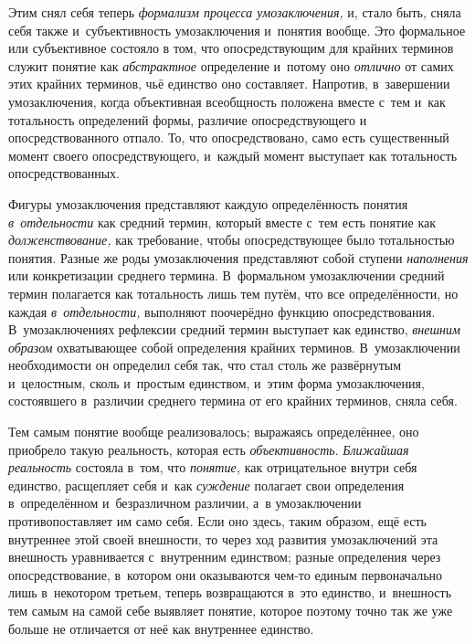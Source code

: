 Этим снял себя теперь {\em формализм процесса умозаключения,}
и, стало быть, сняла себя также и~субъективность
умозаключения и~понятия вообще. Это формальное или субъективное состояло в
том, что опосредствующим для крайних терминов служит понятие как
{\em абстрактное} определение и~потому оно {\em отлично} от самих
этих крайних терминов, чьё единство оно составляет. Напротив, в~завершении
умозаключения, когда объективная всеобщность положена вместе с~тем и~как
тотальность определений формы, различие опосредствующего и
опосредствованного отпало. То, что опосредствовано, само есть существенный
момент своего опосредствующего, и~каждый момент выступает как тотальность
опосредствованных.

Фигуры умозаключения представляют каждую определённость
понятия {\em в~отдельности}
как средний термин, который вместе с~тем есть понятие как
{\em долженствование,}
как требование, чтобы опосредствующее было тотальностью
понятия. Разные же роды умозаключения представляют собой ступени
{\em наполнения} или
конкретизации среднего термина. В~формальном умозаключении средний термин
полагается как тотальность лишь тем путём, что все определённости, но
каждая {\em в~отдельности,}
выполняют поочерёдно функцию опосредствования.
В~умозаключениях рефлексии средний термин выступает как единство,
{\em внешним образом} охватывающее собой определения крайних терминов.
В~умозаключении необходимости он определил себя так, что стал столь же
развёрнутым и~целостным, сколь и~простым единством, и~этим форма
умозаключения, состоявшего в~различии среднего термина от его крайних
терминов, сняла себя.

Тем самым понятие вообще реализовалось; выражаясь
определённее, оно приобрело такую реальность, которая есть
{\em объективность}. {\em Ближайшая реальность} состояла в~том, что
{\em понятие,} как отрицательное внутри себя единство, расщепляет себя и~как
{\em суждение} полагает
свои определения в~определённом и~безразличном различии, а~в умозаключении
противопоставляет им само себя. Если оно здесь, таким образом, ещё есть
внутреннее этой своей внешности, то через ход развития умозаключений эта
внешность уравнивается с~внутренним единством; разные определения через
опосредствование, в~котором они оказываются чем-то единым первоначально
лишь в~некотором третьем, теперь возвращаются в~это единство, и~внешность
тем самым на самой себе выявляет понятие, которое поэтому точно так же уже
больше не отличается от неё как внутреннее единство.

